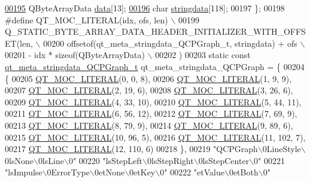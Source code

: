 \begin{DoxyCode}
\hypertarget{a00016_source_l00195}{}\hyperlink{a00016_a52173b02d8396dce2aa3a046123398ea}{00195}     QByteArrayData \hyperlink{a00016_a52173b02d8396dce2aa3a046123398ea}{data}[13];
\hypertarget{a00016_source_l00196}{}\hyperlink{a00016_a8d599799df5356cb10dc7a790a0e26a2}{00196}     \textcolor{keywordtype}{char} \hyperlink{a00016_a8d599799df5356cb10dc7a790a0e26a2}{stringdata}[118];
00197 \};
00198 \textcolor{preprocessor}{#define QT\_MOC\_LITERAL(idx, ofs, len) \(\backslash\)}
00199 \textcolor{preprocessor}{    Q\_STATIC\_BYTE\_ARRAY\_DATA\_HEADER\_INITIALIZER\_WITH\_OFFSET(len, \(\backslash\)}
00200 \textcolor{preprocessor}{    offsetof(qt\_meta\_stringdata\_QCPGraph\_t, stringdata) + ofs \(\backslash\)}
00201 \textcolor{preprocessor}{        - idx * sizeof(QByteArrayData) \(\backslash\)}
00202 \textcolor{preprocessor}{    )}
00203 \textcolor{keyword}{static} \textcolor{keyword}{const} \hyperlink{a00016_d5/d1e/a00103}{qt\_meta\_stringdata\_QCPGraph\_t} qt\_meta\_stringdata\_QCPGraph = \{
00204     \{
00205 \hyperlink{a00016_a75bb9482d242cde0a06c9dbdc6b83abe}{QT\_MOC\_LITERAL}(0, 0, 8),
00206 \hyperlink{a00016_a75bb9482d242cde0a06c9dbdc6b83abe}{QT\_MOC\_LITERAL}(1, 9, 9),
00207 \hyperlink{a00016_a75bb9482d242cde0a06c9dbdc6b83abe}{QT\_MOC\_LITERAL}(2, 19, 6),
00208 \hyperlink{a00016_a75bb9482d242cde0a06c9dbdc6b83abe}{QT\_MOC\_LITERAL}(3, 26, 6),
00209 \hyperlink{a00016_a75bb9482d242cde0a06c9dbdc6b83abe}{QT\_MOC\_LITERAL}(4, 33, 10),
00210 \hyperlink{a00016_a75bb9482d242cde0a06c9dbdc6b83abe}{QT\_MOC\_LITERAL}(5, 44, 11),
00211 \hyperlink{a00016_a75bb9482d242cde0a06c9dbdc6b83abe}{QT\_MOC\_LITERAL}(6, 56, 12),
00212 \hyperlink{a00016_a75bb9482d242cde0a06c9dbdc6b83abe}{QT\_MOC\_LITERAL}(7, 69, 9),
00213 \hyperlink{a00016_a75bb9482d242cde0a06c9dbdc6b83abe}{QT\_MOC\_LITERAL}(8, 79, 9),
00214 \hyperlink{a00016_a75bb9482d242cde0a06c9dbdc6b83abe}{QT\_MOC\_LITERAL}(9, 89, 6),
00215 \hyperlink{a00016_a75bb9482d242cde0a06c9dbdc6b83abe}{QT\_MOC\_LITERAL}(10, 96, 5),
00216 \hyperlink{a00016_a75bb9482d242cde0a06c9dbdc6b83abe}{QT\_MOC\_LITERAL}(11, 102, 7),
00217 \hyperlink{a00016_a75bb9482d242cde0a06c9dbdc6b83abe}{QT\_MOC\_LITERAL}(12, 110, 6)
00218     \},
00219     \textcolor{stringliteral}{"QCPGraph\(\backslash\)0LineStyle\(\backslash\)0lsNone\(\backslash\)0lsLine\(\backslash\)0"}
00220     \textcolor{stringliteral}{"lsStepLeft\(\backslash\)0lsStepRight\(\backslash\)0lsStepCenter\(\backslash\)0"}
00221     \textcolor{stringliteral}{"lsImpulse\(\backslash\)0ErrorType\(\backslash\)0etNone\(\backslash\)0etKey\(\backslash\)0"}
00222     \textcolor{stringliteral}{"etValue\(\backslash\)0etBoth\(\backslash\)0"}

\end{DoxyCode}

